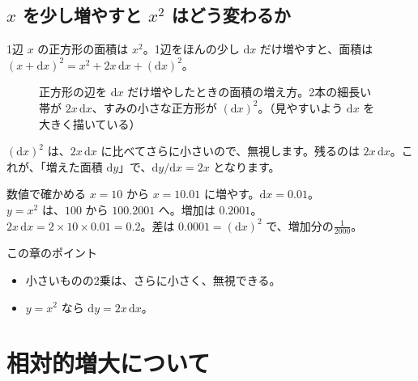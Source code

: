 \documentclass[a4paper,11pt,openany]{ltjsbook}
\newcommand{\dd}{\mathrm{d}}
\begin{document}
\section{$x$ を少し増やすと $x^2$ はどう変わるか}

1辺 $x$ の正方形の面積は $x^2$。1辺をほんの少し $\dd x$ だけ増やすと、面積は $(x+\dd x)^2=x^2+2x\,\dd x+(\dd x)^2$。

\begin{figure}[htbp]
\centering
{}
\caption{正方形の辺を $\dd x$ だけ増やしたときの面積の増え方。2本の細長い帯が $2x\,\dd x$、すみの小さな正方形が $(\dd x)^2$。（見やすいよう $\dd x$ を大きく描いている）}
\end{figure}

$(\dd x)^2$ は、$2x\,\dd x$ に比べてさらに小さいので、無視します。残るのは $2x\,\dd x$。これが、「増えた面積 $\dd y$」で、$\dd y/\dd x=2x$ となります。

\begin{examplebox}{数値で確かめる}
$x=10$ から $x=10.01$ に増やす。$\dd x=0.01$。\\
$y=x^2$ は、$100$ から $100.2001$ へ。増加は $0.2001$。\\
$2x\,\dd x=2\times10\times0.01=0.2$。差は $0.0001=(\dd x)^2$ で、増加分の$\frac1{2000}$。
\end{examplebox}

\begin{pointbox}{この章のポイント}
\begin{itemize}[leftmargin=1.5em]
\item 小さいものの2乗は、さらに小さく、無視できる。
\item $y=x^2$ なら $\dd y=2x\,\dd x$。
\end{itemize}
\end{pointbox}

\chapter{相対的増大について}
\end{document}
